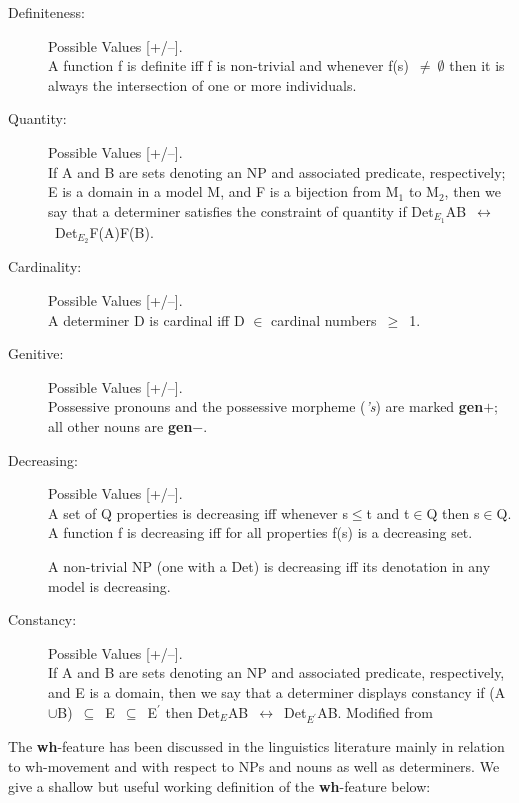 \begin{description}

\item[Definiteness:] Possible Values [+/--]. \\
A function f is definite iff f is non-trivial and whenever
f(s)~$\neq~\emptyset$ then it is always the intersection of one or
more individuals.  \cite{KeenanStavi86:LP}

\item[Quantity:]  Possible Values [+/--]. \\
If A and B are sets denoting an NP and associated predicate, respectively; E is
a domain in a model M, and F is a bijection from M$_{1}$ to M$_{2}$, then we
say that a determiner satisfies the constraint of quantity if
Det$_{E_{1}}$AB~$\leftrightarrow$~Det$_{E_{2}}$F(A)F(B). \cite{Partee90:BK}

\item[Cardinality:]  Possible Values [+/--]. \\
A determiner D is cardinal iff D $\in$ cardinal numbers~$\geq$~1.

\item[Genitive:]  Possible Values [+/--]. \\
Possessive pronouns and the possessive morpheme ({\it 's}) are marked {\bf
gen$+$}; all other nouns are {\bf gen$-$}.

\item[Decreasing:]  Possible Values [+/--]. \\
A set of Q properties is decreasing iff whenever s$\leq$t and t$\in$Q then
s$\in$Q. A function f is decreasing iff for all properties f(s) is a decreasing
set.

A non-trivial NP (one with a Det) is decreasing iff its denotation in any model
is decreasing. \cite{KeenanStavi86:LP}

\item[Constancy:] Possible Values [+/--]. \\
If A and B are sets denoting an NP and associated predicate, respectively, and
E is a domain, then we say that a determiner displays constancy if
(A$\cup$B)~$\subseteq$~E~$\subseteq$~E$^{\prime}$ then
Det$_{E}$AB~$\leftrightarrow$~Det$_{E^{\prime}}$AB. Modified from
\cite{Partee90:BK}

\end{description}

The {\bf wh}-feature has been discussed in the linguistics literature mainly in relation to wh-movement and with respect to NPs and nouns as well as determiners. We give a shallow but useful working definition of the {\bf wh}-feature below:

